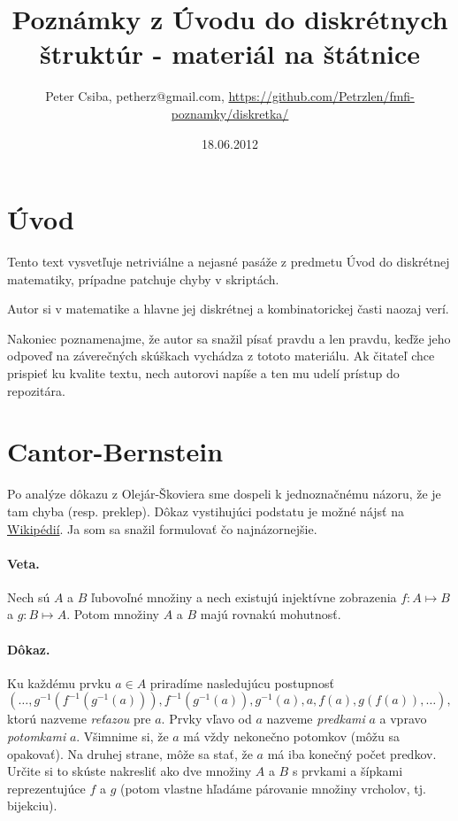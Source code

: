 \documentclass[10pt,a4paper]{article}
\title{Poznámky z Úvodu do diskrétnych štruktúr - materiál na štátnice}
\date{18.06.2012}
\author{Peter Csiba, petherz@gmail.com, \url{https://github.com/Petrzlen/fmfi-poznamky/diskretka/}}
\begin{document}
\maketitle
\tableofcontents

\clearpage

\section*{Úvod}   

Tento text vysvetľuje netriviálne a nejasné pasáže z predmetu Úvod do diskrétnej matematiky,
prípadne patchuje chyby v skriptách. 

Autor si v matematike a hlavne jej diskrétnej a kombinatorickej časti naozaj verí. 

Nakoniec poznamenajme, že autor sa snažil písať pravdu a len pravdu, keďže jeho odpoveď na záverečných skúškach vychádza z tototo materiálu.
Ak čitateľ chce prispieť ku kvalite textu, nech autorovi napíše a ten mu udelí prístup do repozitára.

\clearpage

\section{Cantor-Bernstein}   

Po analýze dôkazu z Olejár-Škoviera sme dospeli k jednoznačnému názoru, že je tam chyba (resp. preklep). Dôkaz vystihujúci podstatu je možné nájsť na \href{http://en.wikipedia.org/wiki/Cantor\%E2\%80\%93Bernstein\%E2\%80\%93Schroeder_theorem}{Wikipédií}. Ja som sa snažil formulovať čo najnázornejšie. 

\paragraph{Veta.} Nech sú $A$ a $B$ ľubovoľné množiny a nech existujú injektívne zobrazenia $f : A \mapsto B$ a $g : B \mapsto A$. Potom množiny $A$ a $B$ majú rovnakú mohutnosť. 

\paragraph{Dôkaz.} Ku každému prvku $a \in A$ priradíme nasledujúcu postupnosť
$$
(\ldots, g^{-1}(f^{-1}(g^{-1}(a))), f^{-1}(g^{-1}(a)), g^{-1}(a), a, f(a), g(f(a)), \ldots),
$$
ktorú nazveme \emph{reťazou} pre $a$. Prvky vľavo od $a$ nazveme \emph{predkami} $a$ a vpravo \emph{potomkami} $a$. Všimnime si, že $a$ má vždy nekonečno potomkov (môžu sa opakovať). Na druhej strane, môže sa stať, že $a$ má iba konečný počet predkov. Určite si to skúste nakresliť ako dve množiny $A$ a $B$ s prvkami a šípkami reprezentujúce $f$ a $g$ (potom vlastne hľadáme párovanie množiny vrcholov, tj. bijekciu).
\end{document}
